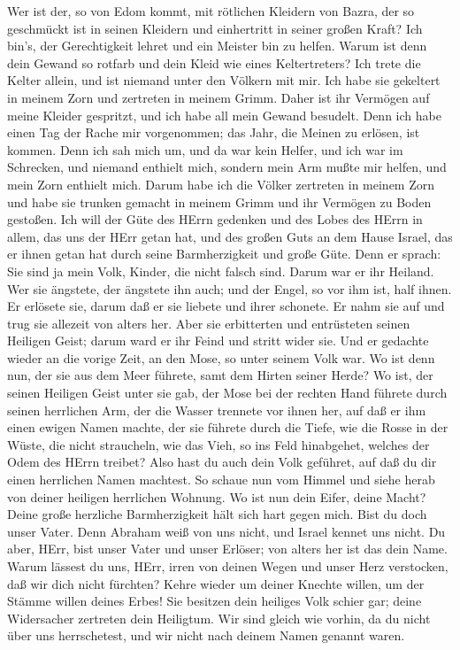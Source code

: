  Wer ist der, so von Edom kommt, mit rötlichen Kleidern von
Bazra, der so geschmückt ist in seinen Kleidern und einhertritt in
seiner großen Kraft? Ich bin's, der Gerechtigkeit lehret und ein Meister
bin zu helfen.  Warum ist denn dein Gewand so rotfarb und
dein Kleid wie eines Keltertreters?  Ich trete die Kelter
allein, und ist niemand unter den Völkern mit mir. Ich habe sie
gekeltert in meinem Zorn und zertreten in meinem Grimm. Daher ist ihr
Vermögen auf meine Kleider gespritzt, und ich habe all mein Gewand
besudelt.  Denn ich habe einen Tag der Rache mir
vorgenommen; das Jahr, die Meinen zu erlösen, ist kommen. 
Denn ich sah mich um, und da war kein Helfer, und ich war im Schrecken,
und niemand enthielt mich, sondern mein Arm mußte mir helfen, und mein
Zorn enthielt mich.  Darum habe ich die Völker zertreten in
meinem Zorn und habe sie trunken gemacht in meinem Grimm und ihr
Vermögen zu Boden gestoßen.  Ich will der Güte des HErrn
gedenken und des Lobes des HErrn in allem, das uns der HErr getan hat,
und des großen Guts an dem Hause Israel, das er ihnen getan hat durch
seine Barmherzigkeit und große Güte.  Denn er sprach: Sie
sind ja mein Volk, Kinder, die nicht falsch sind. Darum war er ihr
Heiland.  Wer sie ängstete, der ängstete ihn auch; und der
Engel, so vor ihm ist, half ihnen. Er erlösete sie, darum daß er sie
liebete und ihrer schonete. Er nahm sie auf und trug sie allezeit von
alters her.  Aber sie erbitterten und entrüsteten seinen
Heiligen Geist; darum ward er ihr Feind und stritt wider sie.
 Und er gedachte wieder an die vorige Zeit, an den Mose, so
unter seinem Volk war. Wo ist denn nun, der sie aus dem Meer führete,
samt dem Hirten seiner Herde? Wo ist, der seinen Heiligen Geist unter
sie gab,  der Mose bei der rechten Hand führete durch
seinen herrlichen Arm, der die Wasser trennete vor ihnen her, auf daß er
ihm einen ewigen Namen machte,  der sie führete durch die
Tiefe, wie die Rosse in der Wüste, die nicht straucheln, 
wie das Vieh, so ins Feld hinabgehet, welches der Odem des HErrn
treibet? Also hast du auch dein Volk geführet, auf daß du dir einen
herrlichen Namen machtest.  So schaue nun vom Himmel und
siehe herab von deiner heiligen herrlichen Wohnung. Wo ist nun dein
Eifer, deine Macht? Deine große herzliche Barmherzigkeit hält sich hart
gegen mich.  Bist du doch unser Vater. Denn Abraham weiß
von uns nicht, und Israel kennet uns nicht. Du aber, HErr, bist unser
Vater und unser Erlöser; von alters her ist das dein Name. 
Warum lässest du uns, HErr, irren von deinen Wegen und unser Herz
verstocken, daß wir dich nicht fürchten? Kehre wieder um deiner Knechte
willen, um der Stämme willen deines Erbes!  Sie besitzen
dein heiliges Volk schier gar; deine Widersacher zertreten dein
Heiligtum.  Wir sind gleich wie vorhin, da du nicht über
uns herrschetest, und wir nicht nach deinem Namen genannt waren.

